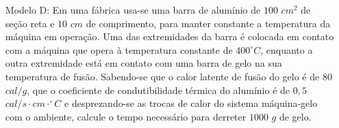 \begin{itemize}
    \item[Modelo D:] Em uma fábrica usa-se uma barra de alumínio de $100$ $cm^2$ de seção reta e $10$ $cm$ de comprimento, para manter constante a temperatura da máquina em operação. Uma das extremidades da barra é colocada em contato com a máquina que opera à temperatura constante de $400^{\circ}C$, enquanto a outra extremidade está em contato com uma barra de gelo na sua temperatura de fusão. Sabendo-se que o calor latente de fusão do gelo é de $80$ $cal/g$, que o coeficiente de condutibilidade térmica do alumínio é de $0,5$ $cal/s \cdot cm \cdot ^{\circ}C$ e desprezando-se as trocas de calor do sistema máquina-gelo com o ambiente, calcule o tempo necessário para derreter $1000$ $g$ de gelo.
    
\end{itemize}